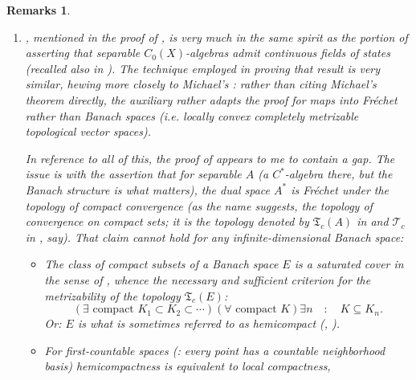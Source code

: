\documentclass[11pt,leqno]{article}
\theoremstyle{plain}
\theoremstyle{plain}
\theoremstyle{plain}
\newtheorem{remarks}[lemma]{Remarks}
\numberwithin{equation}{section}
\theoremstyle{nonumberplain}
\newcommand\cT{{\mathcal T}}
\newcommand\fT{{\mathfrak T}}
\newcommand\1{{\bf 1}}
\begin{document}
\begin{remarks}\label{res:blnch_metr}
  \begin{enumerate}[(1),wide]
  \item \cite[Theorem 2.12]{2409.03531v1}, mentioned in the proof of , is very much in the same spirit as the portion of \cite[Th\'eor\`eme 3.3]{blnch} asserting that separable $C_0(X)$-algebras admit continuous fields of states (recalled also in \cite[Remark 3.10]{bg_cx-exp}). The technique employed in proving that result is very similar, hewing more closely to Michael's \cite[Theorem 3.2'']{mich_contsel-1}: rather than citing Michael's theorem directly, the auxiliary \cite[Lemme 3.8]{blnch} rather adapts the proof for maps into {\it Fr\'echet} rather than Banach spaces (i.e. \cite[\S 10]{trev_tvs} locally convex completely metrizable topological vector spaces).
    
    In reference to all of this, the proof of \cite[Lemme 3.8]{blnch} appears to me to contain a gap. The issue is with the assertion that for separable $A$ (a $C^*$-algebra there, but the Banach structure is what matters), the dual space $A^*$ is Fr\'echet under the topology of {\it compact convergence} (as the name suggests, the topology of convergence on compact sets; it is the topology denoted by $\fT_c(A)$ in \cite[\S 21.6]{k_tvs-1} and $\cT_c$ in \cite[\S IV.3.5]{bourb_tvs}, say). That claim cannot hold for {\it any} infinite-dimensional Banach space:
    \begin{itemize}[wide]
    \item The class of compact subsets of a Banach space $E$ is a {\it saturated} cover in the sense of \cite[\S 39.1]{k_tvs-2}, whence the necessary and sufficient criterion \cite[\S 39.4(6)]{k_tvs-2} for the metrizability of the topology $\fT_c(E)$: 
      \begin{equation*}
        \left(
          \exists \text{ compact }
          K_1\subset K_2\subset \cdots
        \right)
        \left(
          \forall \text{ compact }K
        \right)
        \exists n
        \quad:\quad
        K\subseteq K_n.
      \end{equation*}
      Or: $E$ is what is sometimes referred to as {\it hemicompact} (\cite[Problem 17I]{wil_top}, \cite[p.486, Definition]{ar_top}).
      
    \item For {\it first-countable} spaces (\cite[Definition 10.3]{wil_top}: every point has a countable neighborhood basis) hemicompactness is equivalent \cite[p.486, item b) following Definition]{ar_top} to local compactness, 
      

\end{itemize}
\end{enumerate}
\end{remarks}
\end{document}
